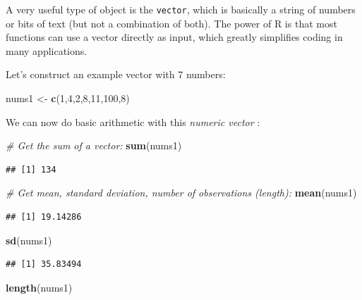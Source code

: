 \documentclass[]{book}
\newenvironment{Shaded}{\begin{snugshade}}{\end{snugshade}}
\newcommand{\CommentTok}[1]{\textcolor[rgb]{0.56,0.35,0.01}{\textit{#1}}}
\newcommand{\DecValTok}[1]{\textcolor[rgb]{0.00,0.00,0.81}{#1}}
\newcommand{\KeywordTok}[1]{\textcolor[rgb]{0.13,0.29,0.53}{\textbf{#1}}}
\newcommand{\NormalTok}[1]{#1}
\newcommand{\StringTok}[1]{\textcolor[rgb]{0.31,0.60,0.02}{#1}}
\begin{document}
A very useful type of object is the \texttt{vector}, which is basically a string of numbers or bits of text (but not a combination of both). The power of R is that most functions can use a vector directly as input, which greatly simplifies coding in many applications.

Let's construct an example vector with 7 numbers:

\begin{Shaded}
\begin{Highlighting}[]
\NormalTok{nums1 <-}\StringTok{ }\KeywordTok{c}\NormalTok{(}\DecValTok{1}\NormalTok{,}\DecValTok{4}\NormalTok{,}\DecValTok{2}\NormalTok{,}\DecValTok{8}\NormalTok{,}\DecValTok{11}\NormalTok{,}\DecValTok{100}\NormalTok{,}\DecValTok{8}\NormalTok{)}
\end{Highlighting}
\end{Shaded}

We can now do basic arithmetic with this \emph{numeric vector} :

\begin{Shaded}
\begin{Highlighting}[]
\CommentTok{# Get the sum of a vector:}
\KeywordTok{sum}\NormalTok{(nums1)}
\end{Highlighting}
\end{Shaded}

\begin{verbatim}
## [1] 134
\end{verbatim}

\begin{Shaded}
\begin{Highlighting}[]
\CommentTok{# Get mean, standard deviation, number of observations (length):}
\KeywordTok{mean}\NormalTok{(nums1)}
\end{Highlighting}
\end{Shaded}

\begin{verbatim}
## [1] 19.14286
\end{verbatim}

\begin{Shaded}
\begin{Highlighting}[]
\KeywordTok{sd}\NormalTok{(nums1)}
\end{Highlighting}
\end{Shaded}

\begin{verbatim}
## [1] 35.83494
\end{verbatim}

\begin{Shaded}
\begin{Highlighting}[]
\KeywordTok{length}\NormalTok{(nums1)}
\end{Highlighting}
\end{Shaded}
\end{document}
